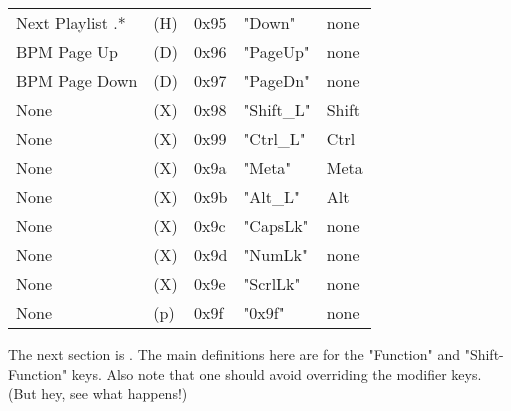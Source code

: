 \begin{table}[htb!]
\begin{tabular}{l l l l l}
        Next Playlist .*   & (H)  &  0x95   & "Down"       & none \\
        BPM Page Up        & (D)  &  0x96   & "PageUp"     & none \\
        BPM Page Down      & (D)  &  0x97   & "PageDn"     & none \\
        None               & (X)  &  0x98   & "Shift\_L"   & Shift \\
        None               & (X)  &  0x99   & "Ctrl\_L"    & Ctrl \\
        None               & (X)  &  0x9a   & "Meta"       & Meta \\
        None               & (X)  &  0x9b   & "Alt\_L"     & Alt \\
        None               & (X)  &  0x9c   & "CapsLk"     & none \\
        None               & (X)  &  0x9d   & "NumLk"      & none \\
        None               & (X)  &  0x9e   & "ScrlLk"     & none \\
        None               & (p)  &  0x9f   & "0x9f"       & none \\
      \end{tabular}
   \end{table}

   The next section is .
   The main definitions here are for the "Function" and "Shift-Function"
   keys. Also note that one should avoid overriding the modifier keys.
   (But hey, see what happens!)

